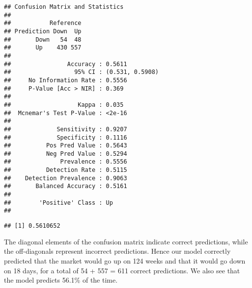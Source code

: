 \documentclass[]{article}
\newenvironment{Shaded}{\begin{snugshade}}{\end{snugshade}}
\newcommand{\KeywordTok}[1]{\textcolor[rgb]{0.13,0.29,0.53}{\textbf{#1}}}
\newcommand{\DataTypeTok}[1]{\textcolor[rgb]{0.13,0.29,0.53}{#1}}
\newcommand{\StringTok}[1]{\textcolor[rgb]{0.31,0.60,0.02}{#1}}
\newcommand{\OperatorTok}[1]{\textcolor[rgb]{0.81,0.36,0.00}{\textbf{#1}}}
\newcommand{\NormalTok}[1]{#1}
\begin{document}
\begin{Shaded}
\end{Shaded}

\begin{verbatim}
## Confusion Matrix and Statistics
## 
##           Reference
## Prediction Down  Up
##       Down   54  48
##       Up    430 557
##                                          
##                Accuracy : 0.5611         
##                  95% CI : (0.531, 0.5908)
##     No Information Rate : 0.5556         
##     P-Value [Acc > NIR] : 0.369          
##                                          
##                   Kappa : 0.035          
##  Mcnemar's Test P-Value : <2e-16         
##                                          
##             Sensitivity : 0.9207         
##             Specificity : 0.1116         
##          Pos Pred Value : 0.5643         
##          Neg Pred Value : 0.5294         
##              Prevalence : 0.5556         
##          Detection Rate : 0.5115         
##    Detection Prevalence : 0.9063         
##       Balanced Accuracy : 0.5161         
##                                          
##        'Positive' Class : Up             
## 
\end{verbatim}

\begin{Shaded}
\end{Shaded}

\begin{verbatim}
## [1] 0.5610652
\end{verbatim}

The diagonal elements of the confusion matrix indicate correct
predictions, while the off-diagonals represent incorrect predictions.
Hence our model correctly predicted that the market would go up on 124
weeks and that it would go down on 18 days, for a total of 54 + 557 =
611 correct predictions. We also see that the model predicts 56.1\% of
the time.
\end{document}
